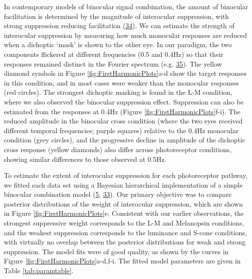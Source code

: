 \documentclass[
]{article}
\begin{document}
In contemporary models of binocular signal combination, the amount of binocular facilitation is determined by the magnitude of interocular suppression, with strong suppression reducing facilitation (\protect\hyperlink{ref-Kingdom2015}{34}). We can estimate the strength of interocular suppression by measuring how much monocular responses are reduced when a dichoptic `mask' is shown to the other eye. In our paradigm, the two components flickered at different frequencies (0.5 and 0.4Hz) so that their responses remained distinct in the Fourier spectrum (e.g. \protect\hyperlink{ref-Busse2009}{35}). The yellow diamond symbols in Figure \ref{fig:FirstHarmonicPlots}a-d show the target responses in this condition, and in most cases were weaker than the monocular responses (red circles). The strongest dichoptic masking is found in the L-M condition, where we also observed the binocular suppression effect. Suppression can also be estimated from the responses at 0.4Hz (Figure \ref{fig:FirstHarmonicPlots}f-i). The reduced amplitude in the binocular cross condition (where the two eyes received different temporal frequencies; purple squares) relative to the 0.4Hz monocular condition (grey circles), and the progressive decline in amplitude of the dichoptic cross response (yellow diamonds) also differ across photoreceptor conditions, showing similar differences to those observed at 0.5Hz.

To estimate the extent of interocular suppression for each photoreceptor pathway, we fitted each data set using a Bayesian hierarchical implementation of a simple binocular combination model (\protect\hyperlink{ref-Segala2023}{5}, \protect\hyperlink{ref-Meese2006}{33}). Our primary objective was to compare posterior distributions of the weight of interocular suppression, which are shown in Figure \ref{fig:FirstHarmonicPlots}e. Consistent with our earlier observations, the strongest suppressive weight corresponds to the L-M and Melanopsin conditions, and the weakest suppression corresponds to the luminance and S-cone conditions, with virtually no overlap between the posterior distributions for weak and strong suppression. The model fits were of good quality, as shown by the curves in Figure \ref{fig:FirstHarmonicPlots}a-d,f-i. The fitted model parameters are given in Table \ref{tab:paramtable}.
\end{document}

